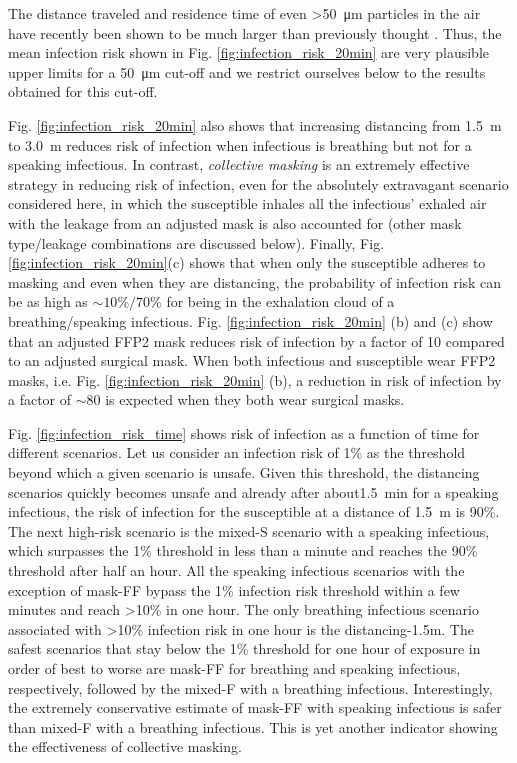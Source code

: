 \documentclass[preprint]{elsarticle}
\begin{document}
The distance traveled and residence time of even \textgreater\SI{50}{\micro\meter} particles in the air have recently been shown to be much larger than previously thought \cite{Chong_2021, Wang2021}. 
Thus, the mean infection risk shown in Fig. \ref{fig:infection_risk_20min} are very plausible upper limits for a \SI{50}{\micro\meter} cut-off and we restrict ourselves below to the results obtained for this cut-off. 

Fig. \ref{fig:infection_risk_20min} also shows that increasing distancing from \SI{1.5}{\meter} to \SI{3.0}{\meter} reduces risk of infection when infectious is breathing but not for a speaking infectious.  
In contrast, \emph{collective masking} is an extremely effective strategy in reducing risk of infection, even for the absolutely extravagant scenario considered here, in which the susceptible inhales all the infectious' exhaled air with the leakage from an adjusted mask is also accounted for (other mask type/leakage combinations are discussed below).
Finally, Fig. \ref{fig:infection_risk_20min}(c) shows that when only the susceptible adheres to masking and even when they are distancing, the probability of infection risk can be as high as ${\sim}10\%/70\%$ for being in the exhalation cloud of a breathing/speaking infectious.
Fig. \ref{fig:infection_risk_20min} (b) and (c) show that an adjusted FFP2 mask reduces risk of infection by a factor of 10 compared to an adjusted surgical mask. 
When both infectious and susceptible wear FFP2 masks, i.e. Fig. \ref{fig:infection_risk_20min} (b), a reduction in risk of infection by a factor of $\sim 80$ is expected when they both wear surgical masks. 

Fig. \ref{fig:infection_risk_time} shows risk of infection as a function of time for different scenarios.
Let us consider an infection risk of 1\% as the threshold beyond which a given scenario is unsafe.
Given this threshold, the distancing scenarios quickly becomes unsafe and already after about\SI{1.5}{\minute} for a speaking infectious, the risk of infection for the susceptible at a distance of \SI{1.5}{\meter} is 90\%. 
The next high-risk scenario is the mixed-S scenario with a speaking infectious, which surpasses the 1\% threshold in less than a minute and reaches the 90\% threshold after half an hour. 
All the speaking infectious scenarios with the exception of mask-FF bypass the 1\% infection risk threshold within a few minutes and reach \textgreater 10\% in one hour. 
The only breathing infectious scenario associated with \textgreater 10\% infection risk in one hour is the distancing-1.5m.  
The safest scenarios that stay below the 1\% threshold for one hour of exposure in order of best to worse are mask-FF for breathing and speaking infectious, respectively, followed by the mixed-F with a breathing infectious.
Interestingly, the extremely conservative estimate of mask-FF with speaking infectious is safer than mixed-F with a breathing infectious. 
This is yet another indicator showing the effectiveness of collective masking. 
\end{document}
